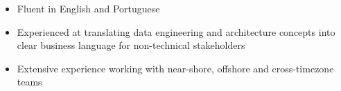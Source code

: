 
\begin{cvparagraph}

\begin{itemize}[leftmargin=2ex, nosep, noitemsep]
  \item Fluent in English and Portuguese
  \item Experienced at translating data engineering and architecture concepts into clear business language for non-technical stakeholders
  \item Extensive experience working with near-shore, offshore and cross-timezone teams
\end{itemize}
\end{cvparagraph}
